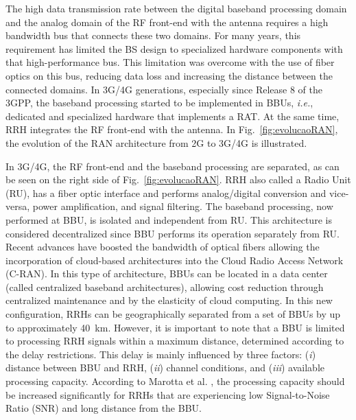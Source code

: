 The high data transmission rate between the digital baseband processing domain and the analog domain of the RF front-end with the antenna requires a high bandwidth bus that connects these two domains. For many years, this requirement has limited the BS design to specialized hardware components with that high-performance bus. This limitation was overcome with the use of fiber optics on this bus, reducing data loss and increasing the distance between the connected domains. In 3G/4G generations, especially since Release 8 of the 3GPP, the baseband processing started to be implemented in BBUs, \textit{i.e.}, dedicated and specialized hardware that implements a RAT. At the same time, RRH integrates the RF front-end with the antenna. In Fig.~\ref{fig:evolucaoRAN}, the evolution of the RAN architecture from 2G to 3G/4G is illustrated.

In 3G/4G, the RF front-end and the baseband processing are separated, as can be seen on the right side of Fig.~\ref{fig:evolucaoRAN}. RRH also called a Radio Unit (RU), has a fiber optic interface and performs analog/digital conversion and vice-versa, power amplification, and signal filtering. The baseband processing, now performed at BBU, is isolated and independent from RU. This architecture is considered decentralized since BBU performs its operation separately from RU. Recent advances have boosted the bandwidth of optical fibers allowing the incorporation of cloud-based architectures into the Cloud Radio Access Network (C-RAN). In this type of architecture, BBUs can be located in a data center (called centralized baseband architectures), allowing cost reduction through centralized maintenance and by the elasticity of cloud computing. In this new configuration, RRHs can be geographically separated from a set of BBUs by up to approximately 40~km. However, it is important to note that a BBU is limited to processing RRH signals within a maximum distance, determined according to the delay restrictions. This delay is mainly influenced by three factors: (\textit{i}) distance between BBU and RRH, (\textit{ii}) channel conditions, and (\textit{iii}) available processing capacity. According to Marotta et al. \cite{Marotta:18}, the processing capacity should be increased significantly for RRHs that are experiencing low Signal-to-Noise Ratio (SNR) and long distance from the BBU. 

